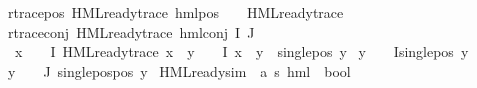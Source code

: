 \begin{isabellebody}
r{\isacharunderscore}{\kern0pt}trace{\isacharunderscore}{\kern0pt}pos{\isacharcolon}{\kern0pt}\ {\isachardoublequoteopen}HML{\isacharunderscore}{\kern0pt}ready{\isacharunderscore}{\kern0pt}trace\ {\isacharparenleft}{\kern0pt}hml{\isacharunderscore}{\kern0pt}pos\ {\isasymalpha}\ {\isasymphi}{\isacharparenright}{\kern0pt}{\isachardoublequoteclose}\ \ {\isachardoublequoteopen}HML{\isacharunderscore}{\kern0pt}ready{\isacharunderscore}{\kern0pt}trace\ {\isasymphi}{\isachardoublequoteclose}{\isacharbar}{\kern0pt}\isanewline
r{\isacharunderscore}{\kern0pt}trace{\isacharunderscore}{\kern0pt}conj{\isacharcolon}{\kern0pt}\ {\isachardoublequoteopen}HML{\isacharunderscore}{\kern0pt}ready{\isacharunderscore}{\kern0pt}trace\ {\isacharparenleft}{\kern0pt}hml{\isacharunderscore}{\kern0pt}conj\ I\ J\ {\isasymPhi}{\isacharparenright}{\kern0pt}{\isachardoublequoteclose}\ \isanewline
{}\ {\isachardoublequoteopen}{\isacharparenleft}{\kern0pt}{\isasymexists}x\ {\isasymin}\ {\isacharparenleft}{\kern0pt}{\isasymPhi}\ {\isacharbackquote}{\kern0pt}\ I{\isacharparenright}{\kern0pt}{\isachardot}{\kern0pt}\ HML{\isacharunderscore}{\kern0pt}ready{\isacharunderscore}{\kern0pt}trace\ x\ {\isasymand}\ {\isacharparenleft}{\kern0pt}{\isasymforall}y\ {\isasymin}\ {\isacharparenleft}{\kern0pt}{\isasymPhi}\ {\isacharbackquote}{\kern0pt}\ I{\isacharparenright}{\kern0pt}{\isachardot}{\kern0pt}\ x\ {\isasymnoteq}\ y\ {\isasymlongrightarrow}\ single{\isacharunderscore}{\kern0pt}pos\ y{\isacharparenright}{\kern0pt}{\isacharparenright}{\kern0pt}\isanewline
{\isasymor}\ {\isacharparenleft}{\kern0pt}{\isasymforall}y\ {\isasymin}\ {\isacharparenleft}{\kern0pt}{\isasymPhi}\ {\isacharbackquote}{\kern0pt}\ I{\isacharparenright}{\kern0pt}{\isachardot}{\kern0pt}single{\isacharunderscore}{\kern0pt}pos\ y{\isacharparenright}{\kern0pt}{\isachardoublequoteclose}\isanewline
{\isachardoublequoteopen}{\isacharparenleft}{\kern0pt}{\isasymforall}y\ {\isasymin}\ {\isacharparenleft}{\kern0pt}{\isasymPhi}\ {\isacharbackquote}{\kern0pt}\ J{\isacharparenright}{\kern0pt}{\isachardot}{\kern0pt}\ single{\isacharunderscore}{\kern0pt}pos{\isacharunderscore}{\kern0pt}pos\ y{\isacharparenright}{\kern0pt}{\isachardoublequoteclose}\isanewline
\isanewline
{}\isamarkupfalse%
\ HML{\isacharunderscore}{\kern0pt}ready{\isacharunderscore}{\kern0pt}sim\ {\isacharcolon}{\kern0pt}{\isacharcolon}{\kern0pt}\ {\isachardoublequoteopen}{\isacharparenleft}{\kern0pt}{\isacharprime}{\kern0pt}a{\isacharcomma}{\kern0pt}\ {\isacharprime}{\kern0pt}s{\isacharparenright}{\kern0pt}\ hml\ {\isasymRightarrow}\ bool{\isachardoublequoteclose}\isanewline

\end{isabellebody}
